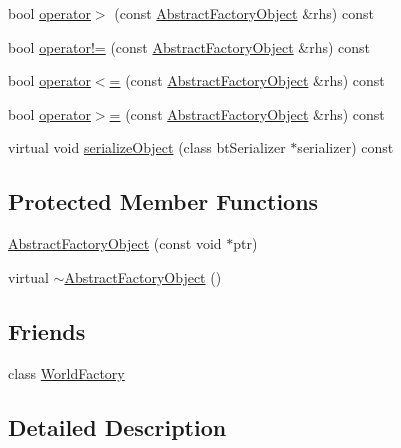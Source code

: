 \begin{DoxyCompactItemize}
bool \hyperlink{classjli_1_1_abstract_factory_object_ae1685aa78a6af563734076dcd756450e}{operator$>$} (const \hyperlink{classjli_1_1_abstract_factory_object}{Abstract\+Factory\+Object} \&rhs) const 
\item 
bool \hyperlink{classjli_1_1_abstract_factory_object_a3acdcb151e49d7a3c4bdb9ccc2462e14}{operator!=} (const \hyperlink{classjli_1_1_abstract_factory_object}{Abstract\+Factory\+Object} \&rhs) const 
\item 
bool \hyperlink{classjli_1_1_abstract_factory_object_ab7e3ebdf2d0fa3b005c5d050960953a2}{operator$<$=} (const \hyperlink{classjli_1_1_abstract_factory_object}{Abstract\+Factory\+Object} \&rhs) const 
\item 
bool \hyperlink{classjli_1_1_abstract_factory_object_a8c1661352be79b3aca8b3ff7f1a129a8}{operator$>$=} (const \hyperlink{classjli_1_1_abstract_factory_object}{Abstract\+Factory\+Object} \&rhs) const 
\item 
virtual void \hyperlink{classjli_1_1_abstract_factory_object_a5476ff6659ee05240662379cde28e7a8}{serialize\+Object} (class bt\+Serializer $\ast$serializer) const 
\end{DoxyCompactItemize}
\subsection*{Protected Member Functions}
\begin{DoxyCompactItemize}
\item 
\hyperlink{classjli_1_1_abstract_factory_object_acfc5faa7803ffeb549cbb9f72f3cf760}{Abstract\+Factory\+Object} (const void $\ast$ptr)
\item 
virtual \hyperlink{classjli_1_1_abstract_factory_object_a0a2163c016c278297e5fd96171f8f6e5}{$\sim$\+Abstract\+Factory\+Object} ()
\end{DoxyCompactItemize}
\subsection*{Friends}
\begin{DoxyCompactItemize}
\item 
class \hyperlink{classjli_1_1_abstract_factory_object_acb96ebb09abe8f2a37a915a842babfac}{World\+Factory}
\end{DoxyCompactItemize}


\subsection{Detailed Description}


